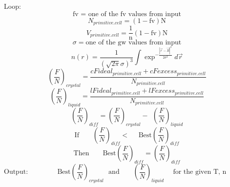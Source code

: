 \documentclass[double,12pt]{beavtex}
\begin{document}
Loop: 
\begin{displaymath}\text{fv = one of the fv values from input}\end{displaymath}
\begin{equation}N_{primitive.cell}=(1-\text{fv})\text{N}\end{equation}
\begin{equation}V_{primitive.cell}=\frac{\text{1}}{\text{n}}(1-\text{fv})\text{N}\end{equation}
\begin{displaymath}\sigma = \text{one of the gw values from input}\end{displaymath}
\begin{equation}{n(r)=\frac{1}{\left(\sqrt{2\pi}\sigma\right)^3}\int\exp^{-\frac{|\vec{r}-\vec{R}|^2}{2\sigma^2}}d\vec{r}}\end{equation} 
\begin{equation}\left(\frac{F}{N}\right)_{crystal}=\frac{cFideal_{primitive.cell} + cFexcess_{primitive.cell}}{N_{primitive.cell}}\end{equation}
\begin{equation}\left(\frac{F}{N}\right)_{liquid}=\frac{lFideal_{primitive.cell} + lFexcess_{primitive.cell}}{N_{primitive.cell}}\end{equation}
\begin{equation}\left(\frac{F}{N}\right)_{diff}=\left(\frac{F}{N}\right)_{crystal}-{~~}\left(\frac{F}{N}\right)_{liquid}\end{equation}
\begin{displaymath}\text{If~~~~~~}\left(\frac{F}{N}\right)_{diff}<\text{~~~~Best}\left(\frac{F}{N}\right)_{diff}\end{displaymath}
\begin{displaymath}\text{Then~~~~~~}\text{Best}\left(\frac{F}{N}\right)_{diff}=\left(\frac{F}{N}\right)_{diff}\end{displaymath}
\begin{displaymath}\text{Output:~~~~~~~~~~~~ Best}\left(\frac{F}{N}\right)_{crystal}\text{~~and~~~~~~}\left(\frac{F}{N}\right)_{liquid}\text{~~~~for the given T, n ~~~~~~~~~~~~~~~~~~~~~~~~~}\end{displaymath} 




\end{document}
